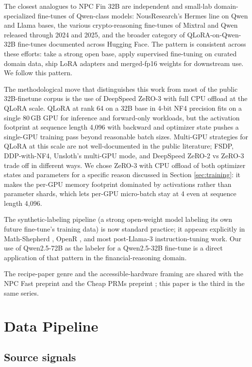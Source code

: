 \documentclass[10pt,letterpaper]{article}
\begin{document}
The closest analogues to NPC Fin 32B are independent and small-lab domain-specialized fine-tunes of Qwen-class models: NousResearch's Hermes line on Qwen and Llama bases, the various crypto-reasoning fine-tunes of Mixtral and Qwen released through 2024 and 2025, and the broader category of QLoRA-on-Qwen-32B fine-tunes documented across Hugging Face. The pattern is consistent across these efforts: take a strong open base, apply supervised fine-tuning on curated domain data, ship LoRA adapters and merged-fp16 weights for downstream use. We follow this pattern.

The methodological move that distinguishes this work from most of the public 32B-finetune corpus is the use of DeepSpeed ZeRO-3 with full CPU offload at the QLoRA scale. QLoRA at rank 64 on a 32B base in 4-bit NF4 precision fits on a single 80\,GB GPU for inference and forward-only workloads, but the activation footprint at sequence length 4{,}096 with backward and optimizer state pushes a single-GPU training pass beyond reasonable batch sizes. Multi-GPU strategies for QLoRA at this scale are not well-documented in the public literature; FSDP, DDP-with-NF4, Unsloth's multi-GPU mode, and DeepSpeed ZeRO-2 vs ZeRO-3 trade off in different ways. We chose ZeRO-3 with CPU offload of both optimizer states and parameters for a specific reason discussed in Section \ref{sec:training}: it makes the per-GPU memory footprint dominated by activations rather than parameter shards, which lets per-GPU micro-batch stay at 4 even at sequence length 4{,}096.

The synthetic-labeling pipeline (a strong open-weight model labeling its own future fine-tune's training data) is now standard practice; it appears explicitly in Math-Shepherd \cite{wang2024mathshepherd}, OpenR \cite{wang2024openr}, and most post-Llama-3 instruction-tuning work. Our use of Qwen2.5-72B as the labeler for a Qwen2.5-32B fine-tune is a direct application of that pattern in the financial-reasoning domain.

The recipe-paper genre and the accessible-hardware framing are shared with the NPC Fast preprint \cite{bachu2026npcfast} and the Cheap PRMs preprint \cite{bachu2026cheapprms}; this paper is the third in the same series.

\section{Data Pipeline}
\label{sec:data}

\subsection{Source signals}
\end{document}
